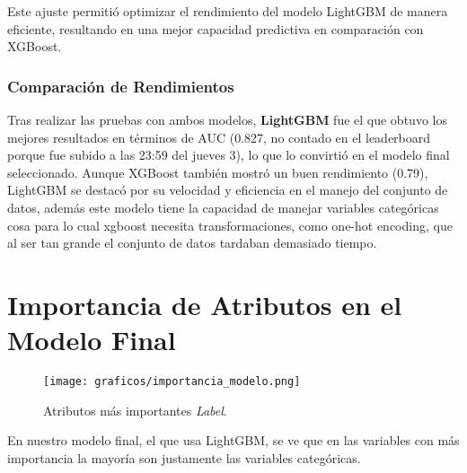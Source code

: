 \documentclass[a4paper,12pt]{article}
\begin{document}
Este ajuste permitió optimizar el rendimiento del modelo LightGBM de manera eficiente, resultando en una mejor capacidad predictiva en comparación con XGBoost.

\subsubsection{Comparación de Rendimientos}

Tras realizar las pruebas con ambos modelos, \textbf{LightGBM} fue el que obtuvo los mejores resultados en términos de AUC (0.827, no contado en el leaderboard porque fue subido a las 23:59 del jueves 3), lo que lo convirtió en el modelo final seleccionado. Aunque XGBoost también mostró un buen rendimiento (0.79), LightGBM se destacó por su velocidad y eficiencia en el manejo del conjunto de datos, además este modelo tiene la capacidad de manejar variables categóricas cosa para lo cual xgboost necesita transformaciones, como one-hot encoding, que al ser tan grande el conjunto de datos tardaban demasiado tiempo. 

\section{Importancia de Atributos en el Modelo Final}
    
\begin{figure}[H]
    \centering
    \texttt{[image: graficos/importancia\_modelo.png]}
    \caption{Atributos más importantes \textit{Label}.}
\end{figure}

En nuestro modelo final, el que usa LightGBM, se ve que en las variables con más importancia la mayoría son justamente las variables categóricas.
\end{document}
